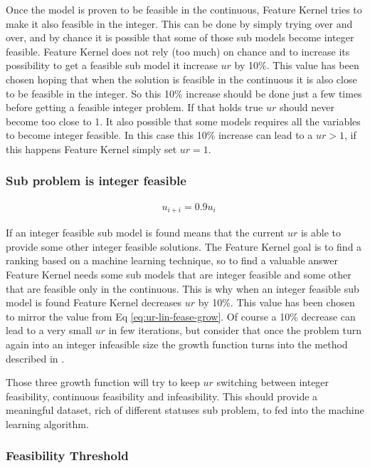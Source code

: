     Once the model is proven to be feasible in the continuous, Feature Kernel tries to make it also feasible in the 
    integer. This can be done by simply trying over and over, and by chance it is possible that some of those sub models
    become integer feasible. Feature Kernel does not rely (too much) on chance and to increase its possibility to get 
    a feasible sub model it increase $ur$ by 10\%. This value has been chosen hoping that when the solution is feasible 
    in the continuous it is also close to be feasible in the integer. So this 10\% increase should be done just a few times
    before getting a feasible integer problem. If that holds true $ur$ should never become too close to 1.  
    It also possible that some models requires all the variables to become integer feasible. In this case this 10\% increase 
    can lead to a $ur > 1$, if this happens Feature Kernel simply set $ur = 1$.

\subsubsection*{Sub problem is integer feasible}
    \begin{align}
        &u_{i+i} = 0.9 u_{i} \label{eq:ur-fease-grow}
    \end{align}


    If an integer feasible sub model is found means that the current $ur$ is able to provide some other integer feasible solutions. 
    The Feature Kernel goal is to find a ranking based on a machine learning technique, so to find a valuable answer Feature Kernel needs
    some sub models that are integer feasible and some other that are feasible only in the continuous. This is why when an integer feasible
    sub model is found Feature Kernel decreases $ur$ by 10\%. This value has been chosen to mirror the value from Eq \ref{eq:ur-lin-fease-grow}.
    Of course a 10\% decrease can lead to a very small $ur$ in few iterations, but consider that once the problem turn again into an integer infeasible 
    size the growth function turns into the method described in .


Those three growth function will try to keep $ur$ switching between integer feasibility, continuous feasibility and infeasibility. This should provide 
a meaningful dataset, rich of different statuses sub problem, to fed into the machine learning algorithm. 


\subsubsection{Feasibility Threshold}

